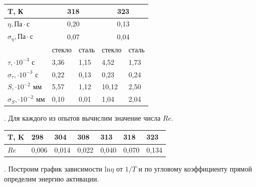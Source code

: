 \documentclass[a4paper,12pt]{article} %
\begin{document}
\begin{table}[h!]
\begin{tabular}{|l|ll|ll|}
\hline
T, К                                    & \multicolumn{2}{c|}{318}            & \multicolumn{2}{c|}{323}            \\ \hline
$\eta, \text{Па} \cdot \text{с}$        & \multicolumn{2}{c|}{0,20}           & \multicolumn{2}{c|}{0,13}           \\ \hline
$\sigma_\eta, \text{Па} \cdot \text{с}$ & \multicolumn{2}{c|}{0,07}           & \multicolumn{2}{c|}{0,04}           \\ \hline
                                        & \multicolumn{1}{l|}{стекло} & сталь & \multicolumn{1}{l|}{стекло} & сталь \\ \hline
$\tau, \cdot 10^{-3}\text{ с}$          & \multicolumn{1}{l|}{3,36}   & 1,15  & \multicolumn{1}{l|}{4,52}   & 1,73  \\ \hline
$\sigma_\tau, \cdot 10^{-3}\text{ с}$   & \multicolumn{1}{l|}{0,22}   & 0,13  & \multicolumn{1}{l|}{0,23}   & 0,24  \\ \hline
$S, \cdot 10^{-2}\text{ мм}$            & \multicolumn{1}{l|}{5,57}   & 1,12  & \multicolumn{1}{l|}{10,12}  & 2,50  \\ \hline
$\sigma_S, \cdot 10^{-2}\text{ мм}$     & \multicolumn{1}{l|}{0,10}   & 0,01  & \multicolumn{1}{l|}{1,04}   & 2,04  \\ \hline
\end{tabular}
\end{table}


. Для каждого из опытов вычислим значение числа $Re$.

\begin{table}[h!]
\begin{tabular}{|l|l|l|l|l|l|l|}
\hline
T, K & 298   & 304   & 308   & 313 & 318   & 323   \\ \hline
$Re$ & 0,006 & 0,014 & 0,022 & 0,040  & 0,070 & 0,134 \\ \hline
\end{tabular}
\end{table}

. Построим график зависимости ln$\eta$ от $1/T$ и по угловому коэффициенту прямой определим энергию активации.  
\end{document}
